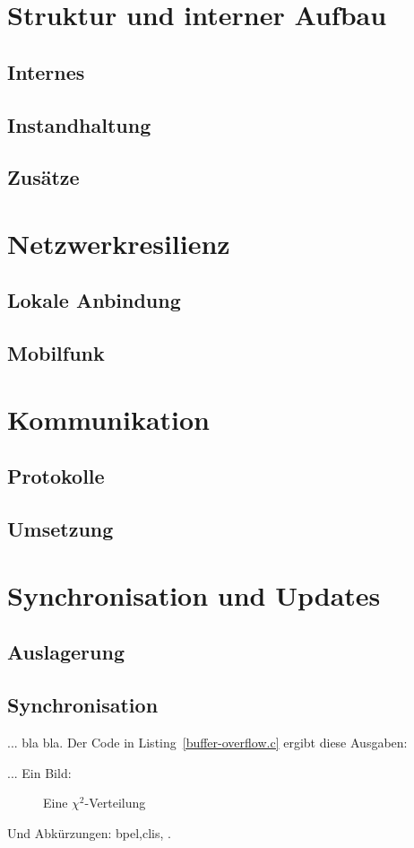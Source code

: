 
\section{Struktur und interner Aufbau}
\subsection{Internes}
\subsection{Instandhaltung}
\subsection{Zusätze}

\section{Netzwerkresilienz}
\subsection{Lokale Anbindung}
\subsection{Mobilfunk}

\section{Kommunikation}
\subsection{Protokolle}
\subsection{Umsetzung}

\section{Synchronisation und Updates}
\subsection{Auslagerung}
\subsection{Synchronisation}

... bla bla. Der Code in Listing~\ref{buffer-overflow.c} ergibt diese Ausgaben:


... Ein Bild:

\begin{figure}[h]
  \caption{Eine $\chi^2$-Verteilung}\label{img-sample}
\end{figure}

Und Abkürzungen: \gls{bpel},\glspl{cli}, .
